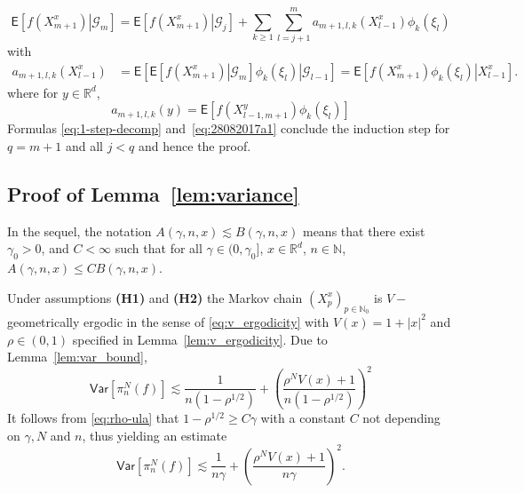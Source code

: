 \documentclass[bj]{imsart}
\def\PVar{\mathsf{Var}}
\def\nset{\mathbb{N}}
\def\rset{\mathbb{R}}
\def\rset{\mathbb{R}}
\begin{document}
\begin{equation}\label{eq:28082017a1}
\mathsf{E}\left[\left.f(X^x_{m+1})\right| \mathcal{G}_m \right]=\mathsf{E}\left[\left.f(X^x_{m+1})\right| \mathcal{G}_j \right]+\sum_{k\geq1}\sum_{l=j+1}^{m}a_{m+1,l,k}(X^x_{l-1})\phi_{k}(\xi_{l})
\end{equation}
with
\begin{align*}
a_{m+1,l,k}(X^x_{l-1}) &= \mathsf{E}\left[\left.\mathsf{E}\left[\left.f(X^x_{m+1})\right|\mathcal{G}_{m}\right]\phi_{k}(\xi_{l})\right|\mathcal{G}_{l-1}\right]
 = \mathsf{E}\left[\left.f(X^x_{m+1})\phi_{k}(\xi_{l})\right|X^x_{l-1}\right].
\end{align*}
where for $y \in \rset^d$,
\[
a_{m+1,l,k}(y) = \mathsf{E}\left[f(X^y_{l-1,m+1})\phi_{k}(\xi_{l})\right]
\]
Formulas \eqref{eq:1-step-decomp}
and~\eqref{eq:28082017a1} conclude the induction step for $q = m+1$ and all $j < q$ and hence the proof.


\subsection{Proof of Lemma~\ref{lem:variance}}
In the sequel, the notation $A(\gamma,n,x) \lesssim B(\gamma,n,x)$ means that there exist $\gamma_0 > 0$, and $C < \infty$ such that for all  $\gamma \in (0,\gamma_0]$, $x \in \rset^d$, $n \in \nset$, $A(\gamma,n,x) \leq C B(\gamma,n,x)$.

Under assumptions {\bf (H1)} and {\bf (H2)} the Markov chain $(X^x_{p})_{p \in \nset_0}$ is $V-$geometrically ergodic in the sense of \eqref{eq:v_ergodicity} with $V(x) = 1+|x|^2$ and $\rho\in (0,1) $ specified in Lemma~\ref{lem:v_ergodicity}. Due to Lemma~\ref{lem:var_bound},
\[
\PVar[\pi_n^N(f)]\lesssim \frac{1}{n(1-\rho^{1/2})} + \left(\frac{\rho^NV(x)+1}{n(1-\rho^{1/2})}\right)^2
\]
It follows from \eqref{eq:rho-ula} that $1-\rho^{1/2} \geq C\gamma$ with a constant $C$ not depending on $\gamma,N$ and $n$, thus yielding an estimate
\[
\PVar[\pi_n^N(f)] \lesssim \frac{1}{n\gamma} + \left(\frac{\rho^NV(x)+1}{n\gamma}\right)^2.
\]
\end{document}
